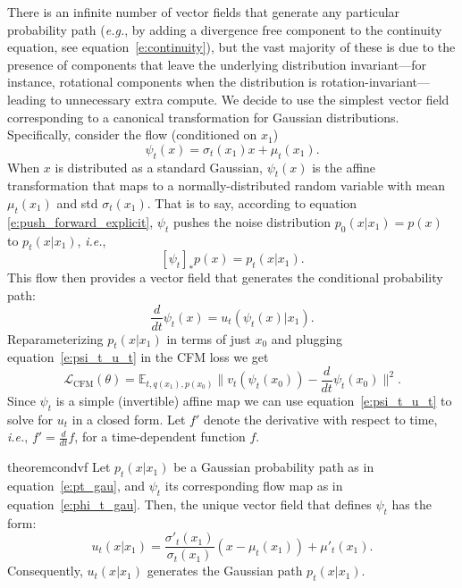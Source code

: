 \documentclass{article}
\makeatletter
\newcommand{\parr}[1]{\left (#1\right )}
\newcommand{\brac}[1]{\left [#1\right ]}
\newcommand{\CFM}{\scriptscriptstyle \text{CFM}}
\newcommand{\eg}{{e.g.}}
\newcommand{\ie}{{i.e.}}
\def\eqref#1{equation~\ref{#1}}
\def\gL{{\mathcal{L}}}
\newcommand{\E}{\mathbb{E}}
\renewcommand*{\eg}{{\it e.g.}\@\xspace}
\renewcommand*{\ie}{{\it i.e.}\@\xspace}
\makeatother
\begin{document}
There is an infinite number of vector fields that generate any particular probability path (\eg, by adding a divergence free component to the continuity equation, see  \eqref{e:continuity}), but the vast majority of these is due to the presence of components that leave the underlying distribution invariant---for instance, rotational components when the distribution is rotation-invariant---leading to unnecessary extra compute.
We decide to use the simplest vector field corresponding to a canonical transformation for Gaussian distributions. Specifically, consider the flow (conditioned on $x_1$)
\begin{equation}\label{e:phi_t_gau}
    \psi_t(x) = \sigma_t(x_1)x + \mu_t(x_1).
\end{equation}
When $x$ is distributed as a standard Gaussian, $\psi_t(x)$ is the affine transformation that maps to a normally-distributed random variable with mean $\mu_t(x_1)$ and std $\sigma_t(x_1)$.
That is to say, according to equation \ref{e:push_forward_explicit}, $\psi_t$ pushes the noise distribution $p_0(x \vert x_1)=p(x)$ to $p_t(x\vert x_1)$, \ie, 
\begin{equation}
    \brac{\psi_t}_*p(x) = p_t(x\vert x_1).
\end{equation} 
This flow then provides a vector field that generates the conditional probability path:
\begin{equation}\label{e:psi_t_u_t}
    \frac{d}{dt}\psi_t(x) = u_t(\psi_t(x)\vert x_1).
\end{equation}
Reparameterizing $p_t(x | x_1)$ in terms of just $x_0$ and plugging \eqref{e:psi_t_u_t} in the CFM loss we get 
\begin{equation}\label{e:cfm_dt_psi}
     \gL_{\CFM}(\theta) 
     =\E_{t, q(x_1), p(x_0)} \Big\|v_t(\psi_t(x_0)) - \frac{d}{dt}\psi_t(x_0)\Big\|^2.     
\end{equation}
Since $\psi_t$ is a simple (invertible) affine map we can use \eqref{e:psi_t_u_t} to solve for $u_t$ in a closed form. Let $f'$ denote the derivative with respect to time, \ie, $f' = \frac{d}{dt}f$, for a time-dependent function $f$.
%
\begin{restatable}{theorem}{condvf}\label{thm:cond_vf}
Let $p_t(x\vert x_1)$ be a Gaussian probability path as in \eqref{e:pt_gau}, and $\psi_t$ its corresponding flow map as in \eqref{e:phi_t_gau}. 
Then, the unique vector field that defines $\psi_t$ has the form:
\begin{equation}\label{e:u_t_cond_x1}
    u_t(x\vert x_1) = 
    \frac{\sigma'_t(x_1)}{\sigma_t(x_1)}\parr{x-\mu_t(x_1)} + \mu'_t(x_1).
\end{equation}
Consequently, $u_t(x\vert x_1)$ generates the Gaussian path $p_t(x\vert x_1)$.
\end{restatable}
\end{document}
